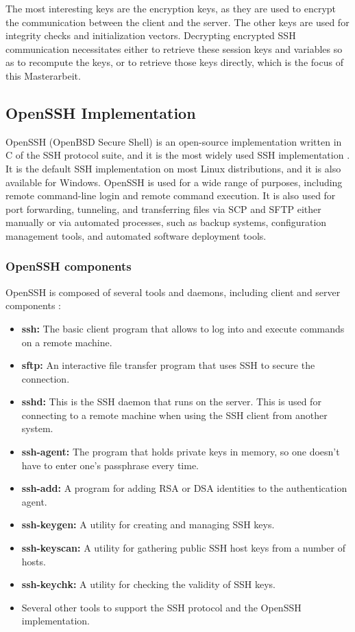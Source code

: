     The most interesting keys are the encryption keys, as they are used to encrypt the communication between the client and the server. The other keys are used for integrity checks and initialization vectors. Decrypting encrypted SSH communication necessitates either to retrieve these session keys and variables so as to recompute the keys, or to retrieve those keys directly, which is the focus of this Masterarbeit. 

    \subsection{OpenSSH Implementation}
    OpenSSH (OpenBSD Secure Shell) is an open-source implementation written in C of the SSH protocol suite, and it is the most widely used SSH implementation \cite{OpenSSHUnderHood07}. It is the default SSH implementation on most Linux distributions, and it is also available for Windows. OpenSSH is used for a wide range of purposes, including remote command-line login and remote command execution. It is also used for port forwarding, tunneling, and transferring files via SCP and SFTP either manually or via automated processes, such as backup systems, configuration management tools, and automated software deployment tools. 

    \subsubsection{OpenSSH components}
    OpenSSH is composed of several tools and daemons, including client and server components \cite{PortableOpenSSHGitHub}:
    \begin{itemize}
        \item \textbf{ssh:} The basic client program that allows to log into and execute commands on a remote machine.
        \item \textbf{sftp:} An interactive file transfer program that uses SSH to secure the connection.
        \item \textbf{sshd:} This is the SSH daemon that runs on the server. This is used for connecting to a remote machine when using the SSH client from another system.
        \item \textbf{ssh-agent:} The program that holds private keys in memory, so one doesn't have to enter one's passphrase every time.
        \item \textbf{ssh-add:} A program for adding RSA or DSA identities to the authentication agent.
        \item \textbf{ssh-keygen:} A utility for creating and managing SSH keys.
        \item \textbf{ssh-keyscan:} A utility for gathering public SSH host keys from a number of hosts.
        \item \textbf{ssh-keychk:} A utility for checking the validity of SSH keys.
        \item Several other tools to support the SSH protocol and the OpenSSH implementation.
    \end{itemize}

